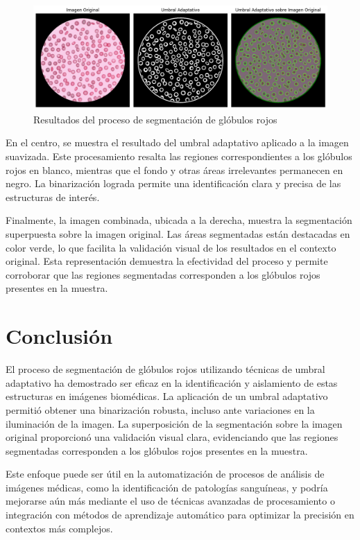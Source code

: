 \documentclass[journal]{IEEEtran}
\begin{document}
\begin{figure}
    \centering
    \includegraphics[width=0.9\linewidth]{Figs/Globulos.png}
    \caption{Resultados del proceso de segmentación de glóbulos rojos}
    \label{globulos}
\end{figure}
En el centro, se muestra el resultado del umbral adaptativo aplicado a la imagen suavizada. Este procesamiento resalta las regiones correspondientes a los glóbulos rojos en blanco, mientras que el fondo y otras áreas irrelevantes permanecen en negro. La binarización lograda permite una identificación clara y precisa de las estructuras de interés.

Finalmente, la imagen combinada, ubicada a la derecha, muestra la segmentación superpuesta sobre la imagen original. Las áreas segmentadas están destacadas en color verde, lo que facilita la validación visual de los resultados en el contexto original. Esta representación demuestra la efectividad del proceso y permite corroborar que las regiones segmentadas corresponden a los glóbulos rojos presentes en la muestra.

\section{Conclusión}
El proceso de segmentación de glóbulos rojos utilizando técnicas de umbral adaptativo ha demostrado ser eficaz en la identificación y aislamiento de estas estructuras en imágenes biomédicas. La aplicación de un umbral adaptativo permitió obtener una binarización robusta, incluso ante variaciones en la iluminación de la imagen. La superposición de la segmentación sobre la imagen original proporcionó una validación visual clara, evidenciando que las regiones segmentadas corresponden a los glóbulos rojos presentes en la muestra.

Este enfoque puede ser útil en la automatización de procesos de análisis de imágenes médicas, como la identificación de patologías sanguíneas, y podría mejorarse aún más mediante el uso de técnicas avanzadas de procesamiento o integración con métodos de aprendizaje automático para optimizar la precisión en contextos más complejos.
\end{document}
